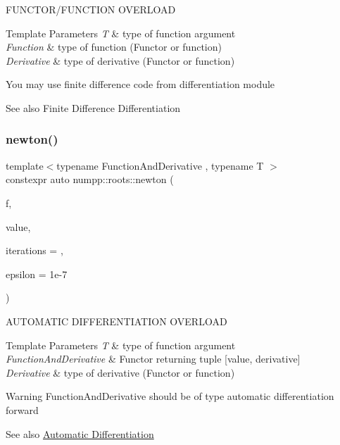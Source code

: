 F\+U\+N\+C\+T\+O\+R/\+F\+U\+N\+C\+T\+I\+ON O\+V\+E\+R\+L\+O\+AD


\begin{DoxyTemplParams}{Template Parameters}
{\em T} & type of function argument \\
\hline
{\em Function} & type of function (Functor or function) \\
\hline
{\em Derivative} & type of derivative (Functor or function)\\
\hline
\end{DoxyTemplParams}
You may use finite difference code from differentiation module

\begin{DoxySeeAlso}{See also}
Finite Difference Differentiation
\end{DoxySeeAlso}
\mbox{\label{group__numpp__roots_ga7784b72874be701ab11320a8ab594e6f}} 
\subsubsection{\texorpdfstring{newton()}{newton()}\hspace{0.1cm}{\footnotesize\ttfamily [3/3]}}
{\footnotesize\ttfamily template$<$typename Function\+And\+Derivative , typename T $>$ \\
constexpr auto numpp\+::roots\+::newton (\begin{DoxyParamCaption}\item[{Function\+And\+Derivative \&\&}]{f,  }\item[{T \&\&}]{value,  }\item[{std\+::size\+\_\+t}]{iterations = {},  }\item[{const double}]{epsilon = {\ttfamily 1e-\/7} }\end{DoxyParamCaption})}

A\+U\+T\+O\+M\+A\+T\+IC D\+I\+F\+F\+E\+R\+E\+N\+T\+I\+A\+T\+I\+ON O\+V\+E\+R\+L\+O\+AD


\begin{DoxyTemplParams}{Template Parameters}
{\em T} & type of function argument \\
\hline
{\em Function\+And\+Derivative} & Functor returning tuple \mbox{[}value, derivative\mbox{]} \\
\hline
{\em Derivative} & type of derivative (Functor or function)\\
\hline
\end{DoxyTemplParams}
\begin{DoxyWarning}{Warning}
Function\+And\+Derivative should be of type automatic differentiation forward
\end{DoxyWarning}
\begin{DoxySeeAlso}{See also}
\hyperlink{group__numpp__differentiation__automatic}{Automatic Differentiation}
\end{DoxySeeAlso}
